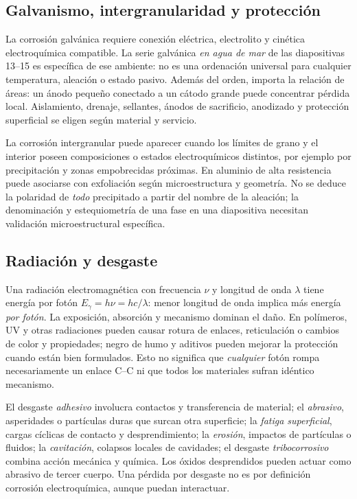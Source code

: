 \subsection{Galvanismo, intergranularidad y protección}
La corrosión galvánica requiere conexión eléctrica, electrolito y cinética electroquímica compatible. La serie galvánica \emph{en agua de mar} de las diapositivas 13--15 es específica de ese ambiente: no es una ordenación universal para cualquier temperatura, aleación o estado pasivo. Además del orden, importa la relación de áreas: un ánodo pequeño conectado a un cátodo grande puede concentrar pérdida local. Aislamiento, drenaje, sellantes, ánodos de sacrificio, anodizado y protección superficial se eligen según material y servicio.

La corrosión intergranular puede aparecer cuando los límites de grano y el interior poseen composiciones o estados electroquímicos distintos, por ejemplo por precipitación y zonas empobrecidas próximas. En aluminio de alta resistencia puede asociarse con exfoliación según microestructura y geometría. No se deduce la polaridad de \emph{todo} precipitado a partir del nombre de la aleación; la denominación y estequiometría de una fase en una diapositiva necesitan validación microestructural específica.

\subsection{Radiación y desgaste}
Una radiación electromagnética con frecuencia $\nu$ y longitud de onda $\lambda$ tiene energía por fotón $E_\gamma=h\nu=hc/\lambda$: menor longitud de onda implica más energía \emph{por fotón}. La exposición, absorción y mecanismo dominan el daño. En polímeros, UV y otras radiaciones pueden causar rotura de enlaces, reticulación o cambios de color y propiedades; negro de humo y aditivos pueden mejorar la protección cuando están bien formulados. Esto no significa que \emph{cualquier} fotón rompa necesariamente un enlace C--C ni que todos los materiales sufran idéntico mecanismo.

El desgaste \emph{adhesivo} involucra contactos y transferencia de material; el \emph{abrasivo}, asperidades o partículas duras que surcan otra superficie; la \emph{fatiga superficial}, cargas cíclicas de contacto y desprendimiento; la \emph{erosión}, impactos de partículas o fluidos; la \emph{cavitación}, colapsos locales de cavidades; el desgaste \emph{tribocorrosivo} combina acción mecánica y química. Los óxidos desprendidos pueden actuar como abrasivo de tercer cuerpo. Una pérdida por desgaste no es por definición corrosión electroquímica, aunque puedan interactuar.

